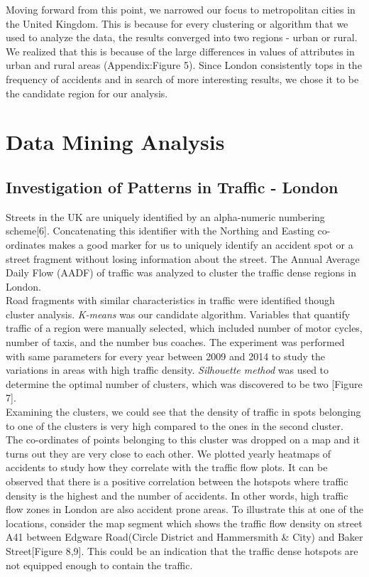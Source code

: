 \documentclass{neu_handout}
\begin{document}
Moving forward from this point, we narrowed our focus to metropolitan cities in the United Kingdom. This is because for every clustering or algorithm that we used to analyze the data, the results converged into two regions - urban or rural. We realized that this is because of the large differences in values of attributes in urban and rural areas (Appendix:Figure 5). Since London consistently  tops in the frequency of accidents and in search of more interesting results, we chose it to be the candidate region for our analysis.

\section{Data Mining Analysis}

\subsection{Investigation of Patterns in Traffic - London}
Streets in the UK are uniquely identified by an alpha-numeric numbering scheme[6]. Concatenating this identifier with the Northing and Easting co-ordinates makes a good marker for us to uniquely identify an accident spot or a street fragment without losing information about the street. The Annual Average Daily Flow (AADF) of traffic was analyzed to cluster the traffic dense regions in London. \\

Road fragments with similar characteristics in traffic were identified though cluster analysis.
\textit{K-means} was our candidate algorithm. Variables that quantify traffic of a region were manually selected, which included number of motor cycles, number of taxis, and the number bus coaches. The  experiment was performed with same parameters for every year between 2009 and 2014 to study the variations in areas with high traffic density. \textit{Silhouette method} was used to determine the optimal number of clusters, which was discovered to be two [Figure 7].\\

Examining the clusters, we could see that the density of traffic in spots belonging to one of the clusters is very high compared to the ones in the second cluster. The co-ordinates of points belonging to this cluster was dropped on a map and it turns out they are very close to each other. We plotted yearly heatmaps of accidents to study how they correlate with the traffic flow plots. It can be observed that there is a positive correlation between the hotspots where traffic density is the highest and the number of accidents. In other words, high traffic flow zones in London are also accident prone areas. To illustrate this at one of the locations, consider the map segment which shows the traffic flow density on street A41 between Edgware Road(Circle District and Hammersmith \& City) and Baker Street[Figure 8,9]. This could be an indication that the traffic dense hotspots are not equipped enough to contain the traffic. \\
\end{document}

